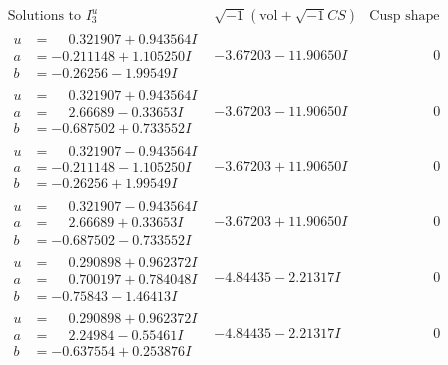 \documentclass[1p]{elsarticle_modified}
\theoremstyle{definition}
\newcommand{\I}{\sqrt{-1}}
\begin{document}
$$\begin{array}{c|c|c}  
\text{Solutions to }I^u_{3}& \I (\text{vol} + \sqrt{-1}CS) & \text{Cusp shape}\\
 \hline 
\begin{aligned}
u &= \phantom{-}0.321907 + 0.943564 I \\
a &= -0.211148 + 1.105250 I \\
b &= -0.26256 - 1.99549 I\end{aligned}
 & -3.67203 - 11.90650 I & \phantom{-0.000000 } 0 \\ \hline\begin{aligned}
u &= \phantom{-}0.321907 + 0.943564 I \\
a &= \phantom{-}2.66689 - 0.33653 I \\
b &= -0.687502 + 0.733552 I\end{aligned}
 & -3.67203 - 11.90650 I & \phantom{-0.000000 } 0 \\ \hline\begin{aligned}
u &= \phantom{-}0.321907 - 0.943564 I \\
a &= -0.211148 - 1.105250 I \\
b &= -0.26256 + 1.99549 I\end{aligned}
 & -3.67203 + 11.90650 I & \phantom{-0.000000 } 0 \\ \hline\begin{aligned}
u &= \phantom{-}0.321907 - 0.943564 I \\
a &= \phantom{-}2.66689 + 0.33653 I \\
b &= -0.687502 - 0.733552 I\end{aligned}
 & -3.67203 + 11.90650 I & \phantom{-0.000000 } 0 \\ \hline\begin{aligned}
u &= \phantom{-}0.290898 + 0.962372 I \\
a &= \phantom{-}0.700197 + 0.784048 I \\
b &= -0.75843 - 1.46413 I\end{aligned}
 & -4.84435 - 2.21317 I & \phantom{-0.000000 } 0 \\ \hline\begin{aligned}
u &= \phantom{-}0.290898 + 0.962372 I \\
a &= \phantom{-}2.24984 - 0.55461 I \\
b &= -0.637554 + 0.253876 I\end{aligned}
 & -4.84435 - 2.21317 I & \phantom{-0.000000 } 0 \\ \hline\begin{aligned}

\end{aligned}
\end{array}$$
\end{document}
